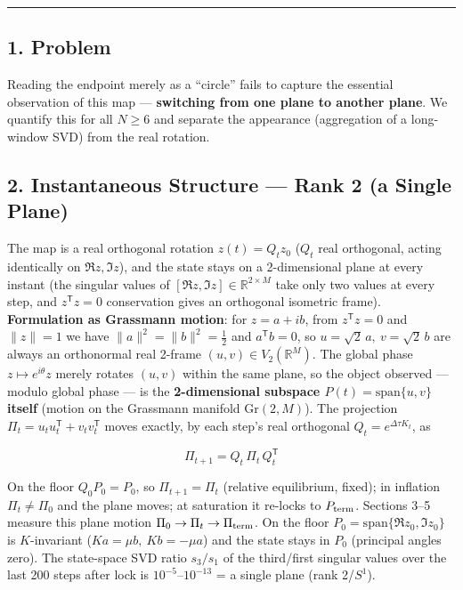 \documentclass[
  a4paper,
]{ltjsarticle}
\begin{document}
\begin{center}\rule{0.5\linewidth}{0.5pt}\end{center}

\subsection{1. Problem}\label{problem}

Reading the endpoint merely as a ``circle'' fails to capture the
essential observation of this map --- \textbf{switching from one plane
to another plane}. We quantify this for all \(N\ge6\) and separate the
appearance (aggregation of a long-window SVD) from the real rotation.

\subsection{2. Instantaneous Structure --- Rank 2 (a Single
Plane)}\label{instantaneous-structure-rank-2-a-single-plane}

The map is a real orthogonal rotation \(z(t)=Q_t z_0\) (\(Q_t\) real
orthogonal, acting identically on \(\Re z,\Im z\)), and the state stays
on a 2-dimensional plane at every instant (the singular values of
\([\Re z,\Im z]\in\mathbb R^{2\times M}\) take only two values at every
step, and \(z^{\mathsf T}z=0\) conservation gives an orthogonal
isometric frame). \textbf{Formulation as Grassmann motion}: for
\(z=a+ib\), from \(z^{\mathsf T}z=0\) and \(\|z\|=1\) we have
\(\|a\|^2=\|b\|^2=\tfrac12\) and \(a^{\mathsf T}b=0\), so
\(u=\sqrt2\,a,\ v=\sqrt2\,b\) are always an orthonormal real 2-frame
\((u,v)\in V_2(\mathbb R^M)\). The global phase
\(z\mapsto e^{i\theta}z\) merely rotates \((u,v)\) within the same
plane, so the object observed --- modulo global phase --- is the
\textbf{2-dimensional subspace \(P(t)=\mathrm{span}\{u,v\}\) itself}
(motion on the Grassmann manifold \(\mathrm{Gr}(2,M)\)). The projection
\(\Pi_t=u_tu_t^{\mathsf T}+v_tv_t^{\mathsf T}\) moves exactly, by each
step's real orthogonal \(Q_t=e^{\Delta\tau K_t}\), as

\[\Pi_{t+1}=Q_t\,\Pi_t\,Q_t^{\mathsf T}\]

On the floor \(Q_0P_0=P_0\), so \(\Pi_{t+1}=\Pi_t\) (relative
equilibrium, fixed); in inflation \(\Pi_t\neq\Pi_0\) and the plane
moves; at saturation it re-locks to \(P_{\rm term}\). Sections 3--5
measure this plane motion \(\Pi_0\to\Pi_t\to\Pi_{\rm term}\). On the
floor \(P_0=\mathrm{span}\{\Re z_0,\Im z_0\}\) is \(K\)-invariant
(\(Ka=\mu b,\ Kb=-\mu a\)) and the state stays in \(P_0\) (principal
angles zero). The state-space SVD ratio \(s_3/s_1\) of the third/first
singular values over the last 200 steps after lock is
\(10^{-5}\)--\(10^{-13}\) = a single plane (rank 2/\(S^1\)).
\end{document}
